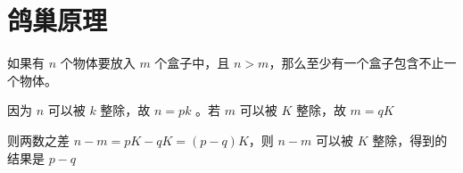 \section{鸽巢原理}

\begin{definition}[鸽巢原理]
    如果有 $n$ 个物体要放入 $m$ 个盒子中，且 $n > m$，那么至少有一个盒子包含不止一个物体。
\end{definition}

\begin{solution}
    因为 $n$ 可以被 $k$ 整除，故 $n=p k$ 。若 $m$ 可以被 $K$ 整除，故 $m=q K$

    则两数之差 $n-m=p K-q K=(p-q) K$，则 $n-m$ 可以被 $K$ 整除，得到的结果是 $p-q$
\end{solution}
